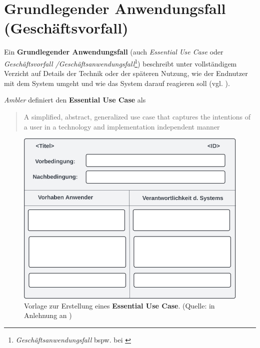 \section{Grundlegender Anwendungsfall (Geschäftsvorfall)}

\begin{tcolorbox}[title={Grundlegender Anwendungsfall (Geschäftsvorfall)}]
    Ein \textbf{Grundlegender Anwendungsfall} (auch \textit{Essential Use Case} oder \textit{Geschäftsvorfall /Geschäftsanwendungsfall}\footnote{
        \textit{Geschäftsanwendungsfall} bspw. bei \cite[101]{Oes05}
    }) beschreibt unter vollständigem Verzicht auf Details der Technik oder der späteren Nutzung, wie der Endnutzer mit dem System umgeht und wie das System darauf reagieren soll (vgl. \cite[68]{Wed09}).
\end{tcolorbox}

\textit{Ambler} definiert den \textbf{Essential Use Case} als
\blockquote[{\cite[184]{Amb04}}]{
    A simplified, abstract, generalized use case that captures the intentions of a user
    in a technology and implementation independent manner
}


\begin{figure}
    \centering
    \includegraphics[scale=0.3]{chapters/Anhang/CheatSheets/img/essentialusecasetemplate}
    \caption{Vorlage zur Erstellung eines \textbf{Essential Use Case}. (Quelle: in Anlehnung an \cite[Figure 2]{CL01})}
    \label{fig:essentialusecasetemplate}
\end{figure}